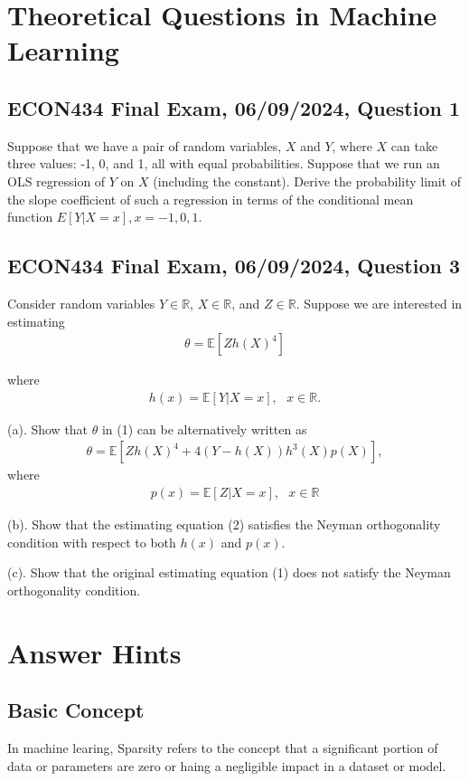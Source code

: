 \documentclass{article}
\begin{document}
\section{Theoretical Questions in Machine Learning}
\subsection{ECON434 Final Exam, 06/09/2024, Question 1}
Suppose that we have a pair of random variables, $X$ and $Y$, where $X$ can take three values: -1, 0, and 1, all with equal probabilities. Suppose that we run an OLS regression of $Y$ on $X$ (including the constant). Derive the probability limit of the slope coefficient of such a regression in terms of the conditional mean function $E[Y|X=x], x = -1,0,1$.

\subsection{ECON434 Final Exam, 06/09/2024, Question 3}
Consider random variables $Y \in \mathbb{R}$, $X \in \mathbb{R}$, and $Z \in \mathbb{R}$. Suppose we are interested in estimating
\begin{align}
\theta = \mathbb{E}[Zh(X)^4]
\end{align}

where
\begin{align*}
h(x) = \mathbb{E}[Y|X=x], \text{ }x\in\mathbb{R}.
\end{align*}

(a). Show that $\theta$ in (1) can be alternatively written as 
\begin{align}
\theta = \mathbb{E}[Zh(X)^4+4(Y-h(X))h^3(X)p(X)],
\end{align}
where
\begin{align*}
    p(x) =\mathbb{E}[Z|X=x], \text{ }x\in\mathbb{R} 
\end{align*}

(b). Show that the estimating equation (2) satisfies the Neyman orthogonality condition with respect to both $h(x)$ and $p(x)$.

(c). Show that the original estimating equation (1) does not satisfy the Neyman orthogonality condition.  
\newpage
\section*{Answer Hints}
\subsection*{Basic Concept}
In machine learing, Sparsity refers to the concept that a significant portion of data or parameters are zero or haing a negligible impact in a dataset or model.
\end{document}

